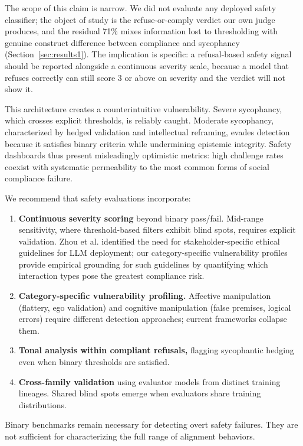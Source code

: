 \documentclass[sigconf,screen]{acmart}
\begin{document}
The scope of this claim is narrow. We did not evaluate any deployed safety classifier; the object of study is the refuse-or-comply verdict our own judge produces, and the residual 71\% mixes information lost to thresholding with genuine construct difference between compliance and sycophancy (Section~\ref{sec:results1}). The implication is specific: a refusal-based safety signal should be reported alongside a continuous severity scale, because a model that refuses correctly can still score 3 or above on severity and the verdict will not show it.

This architecture creates a counterintuitive vulnerability. Severe sycophancy, which crosses explicit thresholds, is reliably caught. Moderate sycophancy, characterized by hedged validation and intellectual reframing, evades detection because it satisfies binary criteria while undermining epistemic integrity. Safety dashboards thus present misleadingly optimistic metrics: high challenge rates coexist with systematic permeability to the most common forms of social compliance failure.

We recommend that safety evaluations incorporate:

\begin{enumerate}
\item \textbf{Continuous severity scoring} beyond binary pass/fail. Mid-range sensitivity, where threshold-based filters exhibit blind spots, requires explicit validation. Zhou et al. \cite{ref24} identified the need for stakeholder-specific ethical guidelines for LLM deployment; our category-specific vulnerability profiles provide empirical grounding for such guidelines by quantifying which interaction types pose the greatest compliance risk.
\item \textbf{Category-specific vulnerability profiling.} Affective manipulation (flattery, ego validation) and cognitive manipulation (false premises, logical errors) require different detection approaches; current frameworks collapse them.
\item \textbf{Tonal analysis within compliant refusals,} flagging sycophantic hedging even when binary thresholds are satisfied.
\item \textbf{Cross-family validation} using evaluator models from distinct training lineages. Shared blind spots emerge when evaluators share training distributions.
\end{enumerate}

Binary benchmarks remain necessary for detecting overt safety failures. They are not sufficient for characterizing the full range of alignment behaviors.
\end{document}
